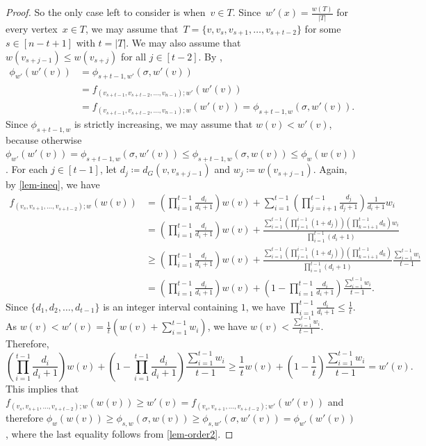 \documentclass[10pt,a4paper]{amsart}
\newcommand*{\abs}[1]{\ensuremath{{\left\lvert {#1} \right\rvert}}}
\begin{document}
\begin{proof}
    
    So the only case left to consider is when~${v\in T}$. 
    Since~${w'(x) = \frac{w(T)}{\abs{T}}}$ for every vertex~$x\in T$, we may assume that~${T=\{v,v_s,v_{s+1},\ldots,v_{s+t-2}\}}$ for some~${s \in [n-t+1]}$ with $t=\abs{T}$.
    We may also assume that~${w(v_{s+j-1}) \leq w(v_{s+j})}$ for all $j\in [t-2]$.
    By , 
    \begin{align*}
        \phi_{w'}(w'(v)) 
        &= \phi_{s+t-1, w'}(\sigma, w'(v)) \\
        &= f_{(v_{s+t-1},v_{s+t-2},\ldots,v_{n-1});w'}(w'(v)) \\
        &= f_{(v_{s+t-1},v_{s+t-2},\ldots,v_{n-1});w}(w'(v))
        =\phi_{s+t-1,w}(\sigma,w'(v)).
    \end{align*}
    Since $\phi_{s+t-1,w}$ is strictly increasing, we may assume that $w(v)<w'(v)$, because otherwise $\phi_{w'}(w'(v))= \phi_{s+t-1,w}(\sigma,w'(v))\le \phi_{s+t-1,w}(\sigma,w(v))\le \phi_w(w(v))$.
    For each $j\in [t-1]$, let $d_j\coloneqq d_G(v,v_{s+j-1})$ and $w_j\coloneqq w(v_{s+j-1})$.
    Again, by \cref{lem-ineq}, we have 
    \begin{align*}
        f_{(v_s, v_{s+1},\ldots,v_{s+t-2});w}(w(v)) 
        &= \left(\prod_{i=1}^{t-1}\frac{d_i}{d_i+1} \right)w(v) 
        + \sum_{i=1}^{t-1} \left(\prod_{j=i+1}^{t-1} \frac{d_j}{d_j+1} \right)\frac{1}{d_i+1} w_i\\
        &=\left(\prod \limits_{i=1}^{t-1}\frac{d_i}{d_i+1} \right)w(v)
        + \frac{
        \sum \limits_{i=1}^{t-1} \left(\prod \limits_{j=1}^{i-1}(1+d_j)\right)\left(\prod \limits_{k=i+1}^{t-1} d_k \right) w_i }
        {\prod\limits_{i=1}^{t-1} (d_i+1)}\\
        &\geq \left(\prod_{i=1}^{t-1}\frac{d_i}{d_i+1} \right)w(v) 
        +  \frac{
        \sum \limits_{i=1}^{t-1} \left(\prod \limits_{j=1}^{i-1}(1+d_j)\right)\left(\prod \limits_{k=i+1}^{t-1} d_k \right) }
        {\prod \limits_{i=1}^{t-1} (d_i+1)}\frac{\sum \limits_{i=1}^{t-1} w_i}{t-1} \\
        &=  \left(\prod\limits_{i=1}^{t-1}\frac{d_i}{d_i+1} \right)w(v) 
        +  \left(1-\prod\limits_{i=1}^{t-1}\frac{d_i}{d_i+1} \right)
        \frac{\sum\limits_{i=1}^{t-1} w_i}{t-1}.
    \end{align*}
    Since $\{d_1,d_2,\ldots,d_{t-1}\}$ is an integer interval containing $1$,  we have 
    $\prod_{i=1}^{t-1}\frac{d_i}{d_i+1} \le \frac{1}{t}$.
    As $w(v)<w'(v)=
    \frac1t (w(v)+\sum_{i=1}^{t-1} w_i)$, we have $w(v)<\frac{\sum_{i=1}^{t-1}w_i}{t-1}$.
    Therefore, 
    \[ 
        \left(\prod_{i=1}^{t-1}\frac{d_i}{d_i+1} \right)w(v) 
        +  \left(1-\prod_{i=1}^{t-1}\frac{d_i}{d_i+1} \right)
        \frac{\sum \limits_{i=1}^{t-1} w_i}{t-1}
        \geq \frac{1}{t} w(v)+ \left(1-\frac1t\right) \frac{\sum \limits_{i=1}^{t-1} w_i}{t-1} = w'(v).
    \] 
    This implies that $f_{(v_s, v_{s+1},\ldots,v_{s+t-2});w}(w(v)) \geq w'(v) = f_{(v_s, v_{s+1},\ldots,v_{s+t-2});w'}(w'(v))$ and therefore 
    $\phi_w(w(v))\ge \phi_{s,w}(\sigma,w(v))\ge \phi_{s,w'}(\sigma,w'(v))=\phi_{w'}(w'(v))$, 
    where the last equality follows from \cref{lem-order2}.
\end{proof}
\end{document}
